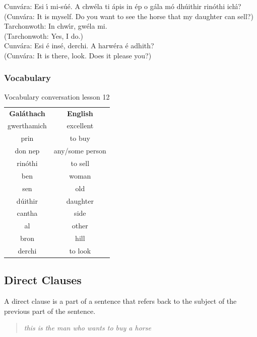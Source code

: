 Cunv\'{a}ra: Esi \'{\i} mi-s\'{u}\'{e}. A chw\'{e}la ti \'{a}pis in \'{e}p o g\'{a}la m\'{o} dh\'{u}ithir rin\'{o}thi ich\'{\i}?\\
(Cunv\'{a}ra: It is myself. Do you want to see the horse that my daughter can sell?)\\

Tarchonwoth: In chw\'{\i}r, gw\'{e}la mi.\\
(Tarchonwoth: Yes, I do.)\\

Cunv\'{a}ra: Esi \'{e} ins\'{e}, derchi. A harw\'{e}ra \'{e} adhith?\\
(Cunv\'{a}ra: It is there, look. Does it please you?)\\

\subsubsection{Vocabulary}

\begin{table}[H]
\centering
\begin{tabular}{cc}
  \toprule
  \textbf{Gal\'{a}thach} & \textbf{English}\\
  \cmidrule(lr){1-1}\cmidrule(lr){2-2}
  gwerthamich & excellent\\
  prin & to buy\\
  don nep & any/some person\\
  rin\'{o}thi & to sell\\
  ben & woman\\
  sen & old\\
  d\'{u}ithir & daughter\\
  cantha & side\\
  al & other\\
  bron & hill\\
  derchi & to look\\
  \bottomrule
\end{tabular}
\label{vocab_conversation_lesson12}
\caption{Vocabulary conversation lesson 12}
\end{table}

\subsection{Direct Clauses}

A direct clause is a part of a sentence that refers back to the subject of the previous part of the sentence.

\begin{quote}
  \textit{this is the man who wants to buy a horse}
\end{quote}

